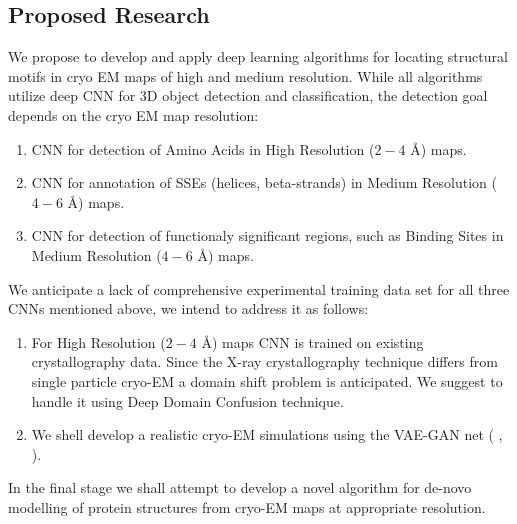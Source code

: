 \subsection{Proposed Research}
We propose to develop and apply deep learning algorithms for locating structural motifs in cryo EM maps of high and medium resolution.
While all algorithms utilize deep CNN for 3D object detection and classification, the detection goal depends on the  cryo EM map resolution:
\begin{enumerate}%
    \item CNN for detection of Amino Acids in  High Resolution ($2-4$ {\AA}) maps.
    \item CNN for annotation of SSEs (helices, beta-strands)  in  Medium Resolution ($4-6$ {\AA}) maps.
     \item CNN for detection of functionaly significant regions,  such as Binding Sites  in  Medium Resolution  ($4-6$ {\AA}) maps.
\end{enumerate}
We  anticipate a  lack of comprehensive experimental training data set for all three CNNs mentioned above, we intend to address it as follows:
\begin{enumerate}%
    \item For  High Resolution ($2-4$ {\AA}) maps CNN is trained on existing crystallography data. 
    Since the X-ray crystallography  technique differs from single particle cryo-EM a domain shift problem is anticipated.
    We suggest to handle it  using Deep Domain Confusion \cite{Tzeng2014} technique. 
    \item We shell develop a realistic cryo-EM simulations using the VAE-GAN net (\cite{Larsen2016} , \cite{Wu}).
\end{enumerate}

In the final stage we shall attempt to develop a novel algorithm for de-novo modelling of protein structures from cryo-EM maps at appropriate resolution.


